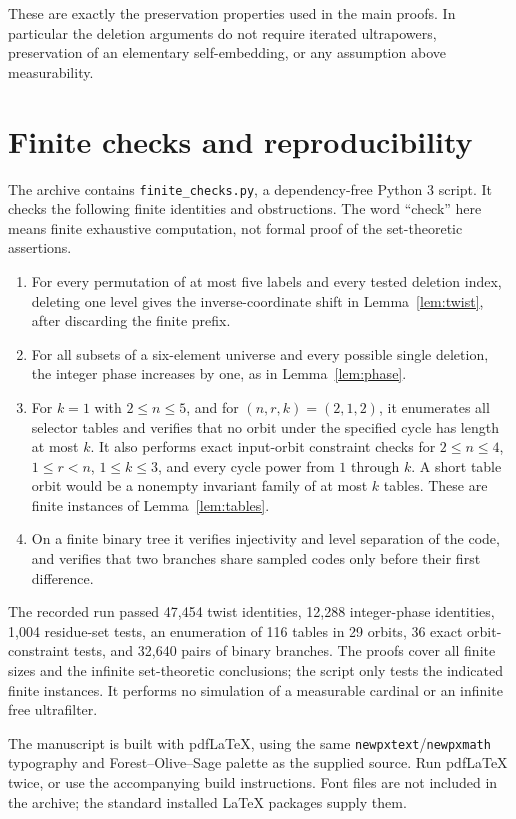 \documentclass[11pt,letterpaper]{article}
\theoremstyle{definition}
\numberwithin{equation}{section}
\begin{document}
These are exactly the preservation properties used in the main proofs. In particular the deletion arguments do not require iterated ultrapowers, preservation of an elementary self-embedding, or any assumption above measurability.

\section{Finite checks and reproducibility}\label{app:checks}

The archive contains \nolinkurl{finite_checks.py}, a dependency-free Python 3 script. It checks the following finite identities and obstructions. The word ``check'' here means finite exhaustive computation, not formal proof of the set-theoretic assertions.

\begin{enumerate}
\item For every permutation of at most five labels and every tested deletion index, deleting one level gives the inverse-coordinate shift in Lemma~\ref{lem:twist}, after discarding the finite prefix.
\item For all subsets of a six-element universe and every possible single deletion, the integer phase increases by one, as in Lemma~\ref{lem:phase}.
\item For $k=1$ with $2\le n\le5$, and for $(n,r,k)=(2,1,2)$, it enumerates all selector tables and verifies that no orbit under the specified cycle has length at most $k$. It also performs exact input-orbit constraint checks for $2\le n\le4$, $1\le r<n$, $1\le k\le3$, and every cycle power from $1$ through $k$. A short table orbit would be a nonempty invariant family of at most $k$ tables. These are finite instances of Lemma~\ref{lem:tables}.
\item On a finite binary tree it verifies injectivity and level separation of the code, and verifies that two branches share sampled codes only before their first difference.
\end{enumerate}

The recorded run passed 47,454 twist identities, 12,288 integer-phase identities, 1,004 residue-set tests, an enumeration of 116 tables in 29 orbits, 36 exact orbit-constraint tests, and 32,640 pairs of binary branches. The proofs cover all finite sizes and the infinite set-theoretic conclusions; the script only tests the indicated finite instances. It performs no simulation of a measurable cardinal or an infinite free ultrafilter.

The manuscript is built with pdfLaTeX, using the same \texttt{newpxtext}/\texttt{newpxmath} typography and Forest--Olive--Sage palette as the supplied source. Run pdfLaTeX twice, or use the accompanying build instructions. Font files are not included in the archive; the standard installed LaTeX packages supply them.
\end{document}
